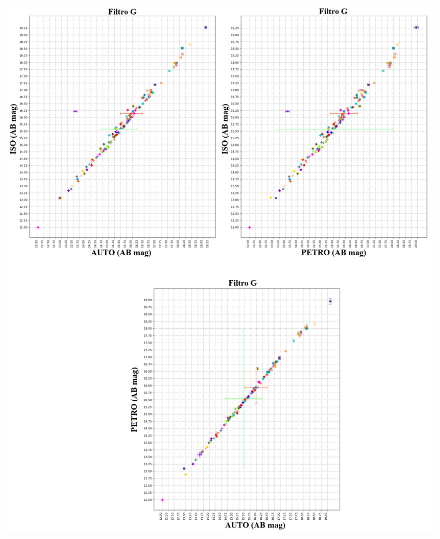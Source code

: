 \begin{anexosenv}
    \begin{figure}[h]
        \centering
        \includegraphics[width=1.0\textwidth]{Imagens/g_auto_iso.png}
        \caption[]{}
        \label{fig:g_auto_iso} 
    \end{figure}


\end{anexosenv}
